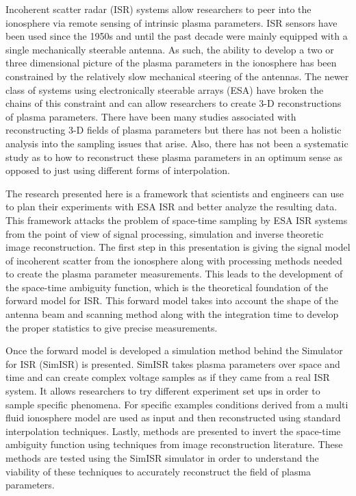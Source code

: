 
Incoherent scatter radar (ISR) systems allow researchers to peer into the ionosphere via remote sensing of intrinsic plasma parameters. ISR sensors have been used since the 1950s and until the past decade were mainly equipped with a single mechanically steerable antenna. As such, the ability to develop a two or three dimensional picture of the plasma parameters in the ionosphere has been constrained by the relatively slow mechanical steering of the antennas. The newer class of systems using electronically steerable arrays (ESA) have broken the chains of this constraint and can allow researchers to create 3-D reconstructions of plasma parameters. There have been many studies associated with reconstructing 3-D fields of plasma parameters but there has not been a holistic analysis into the sampling issues that arise. Also, there has not been a systematic study as to how to reconstruct these plasma parameters in an optimum sense as opposed to just using different forms of interpolation.

The research presented here is a framework that scientists and engineers can use to plan their experiments with ESA ISR and better analyze the resulting data. This framework attacks the problem of space-time sampling by ESA ISR systems from the point of view of signal processing, simulation and inverse theoretic image reconstruction. The first step in this presentation is giving the signal model of incoherent scatter from the ionosphere along with processing methods needed to create the plasma parameter measurements. This leads to the development of the space-time ambiguity function, which is the theoretical foundation of the forward model for ISR. This forward model takes into account the shape of the antenna beam and scanning method along with the integration time to develop the proper statistics to give precise measurements.

Once the forward model is developed a simulation method behind the Simulator for ISR (SimISR) is presented. SimISR takes plasma parameters over space and time and can create complex voltage samples as if they came from a real ISR system. It allows researchers to try different experiment set ups in order to sample specific phenomena. For specific examples conditions derived from a multi fluid ionosphere model are used as input and then reconstructed using standard interpolation techniques. Lastly, methods are presented to invert the space-time ambiguity function using techniques from image reconstruction literature. These methods are tested using the SimISR simulator in order to understand the viability of these techniques to accurately reconstruct the field of plasma parameters.
